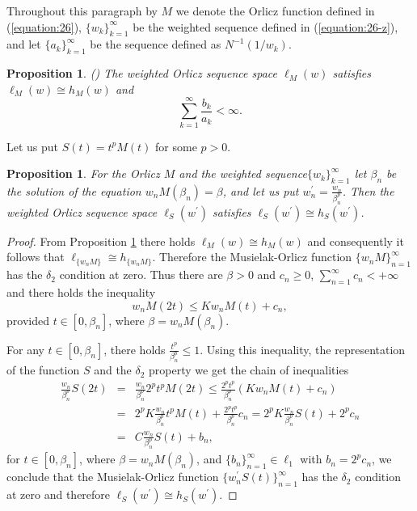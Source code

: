 \documentclass[12pt]{article}
\theoremstyle{thmstyleone}%
\newtheorem{proposition}[theorem]{Proposition}%
\theoremstyle{thmstyletwo}%
\theoremstyle{thmstylethree}%
\begin{document}
{Throughout this paragraph by $M$ we denote the Orlicz function
defined in (\ref{equation:26}), {$\{w_k\}_{k=1}^\infty$ be the weighted sequence defined in (\ref{equation:26-z}),} and let $\{a_k\}_{k=1}^\infty$ be the sequence defined as $N^{-1}(1/w_k)$.

\begin{proposition}\label{proposition:21}(\cite{Zlatanov})
	The weighted Orlicz sequence space $\ell_M(w)$ satisfies $\ell_M(w)\cong h_M(w)$ and
	$$
	\sum_{k=1}^\infty \frac{b_k}{a_k}<\infty .
	$$
\end{proposition}

{Let us put $S(t)=t^pM(t)$ for some $p>0$.}

\begin{proposition}\label{proposition:22}
	{For the Orlicz $M$ and the weighted sequence$\{w_k\}_{k=1}^\infty$ let $\beta_n$ be the solution of the equation $w_nM(\beta_n)=\beta$, and let us put $w_n^\prime=\frac{w_n}{\beta_n^p}$.
	Then }the weighted Orlicz sequence space $\ell_S(w^\prime)$ satisfies $\ell_S(w^\prime)\cong h_S(w^\prime)$.
\end{proposition}

\begin{proof} {From Proposition \ref{proposition:21} there holds} $\ell_M(w)\cong h_M(w)$ and {consequently} it follows that $\ell_{\{w_nM\}}\cong h_{\{w_nM\}}$.
	Therefore the Musielak-Orlicz function $\{w_nM\}_{n=1}^\infty$ has the $\delta_2$ condition at zero.
	Thus there are $\beta>0$ and $c_n\geq 0$, $\sum_{n=1}^\infty c_n<+\infty$ and there holds the inequality
	\begin{equation}\label{equation:27}
		w_nM(2t)\leq Kw_nM(t)+c_n, 
	\end{equation}
	provided $t\in [0,\beta_n]$, where $\beta=w_nM(\beta_{n})$.
	
	{For any $t\in [0,\beta_n]$, there holds $\frac{t^p}{\beta_n^p}\leq 1$. Using this inequality, the representation of the function $S$ and the $\delta_2$ property we get the }chain of inequalities  
	$$
	\begin{array}{lll}
		\displaystyle\frac{w_n}{\beta_n^p}S(2t)&=&\displaystyle\frac{w_n}{\beta_n^p}2^pt^pM(2t)\leq \frac{2^pt^p}{\beta_n^p}(Kw_nM(t)+c_n)\\
		&=&\displaystyle2^pK\frac{w_n}{\beta_n^p}t^pM(t)+{\frac{2^pt^p}{\beta_n^p}}c_n=2^pK\frac{w_n}{\beta_n^p}S(t)+{2^p}c_n\\
		&=&C\displaystyle\frac{w_n}{\beta_n^p}S(t)+b_n,  
	\end{array}
	$$
	for $t\in [0,\beta_n]$, where $\beta=w_nM(\beta_{n})$, and $\{b_n\}_{n=1}^\infty\in\ell_1$ {with $b_n=2^pc_n$,}
	we conclude that the Musielak-Orlicz function $\{w_n^\prime S(t)\}_{n=1}^\infty$
	has the $\delta_2$ condition at zero and therefore $\ell_S(w^\prime)\cong h_S(w^\prime)$.
\end{proof}

}
\end{document}
